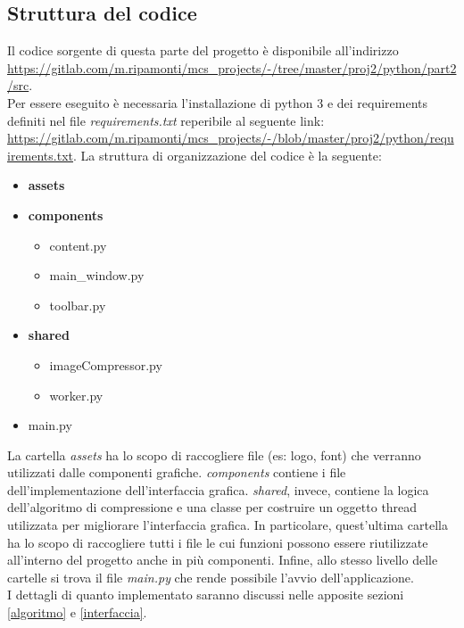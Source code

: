 \subsection{Struttura del codice}
Il codice sorgente di questa parte del progetto è disponibile all'indirizzo \url{https://gitlab.com/m.ripamonti/mcs_projects/-/tree/master/proj2/python/part2/src}. \\
Per essere eseguito è necessaria l'installazione di python 3 e dei requirements definiti nel file \emph{requirements.txt} reperibile al seguente link: \url{https://gitlab.com/m.ripamonti/mcs_projects/-/blob/master/proj2/python/requirements.txt}.
La struttura di organizzazione del codice è la seguente:
\begin{itemize}
    \item \textbf{assets}
    \item \textbf{components}
    \begin{itemize}
        \item content.py
        \item main\_window.py
        \item toolbar.py
    \end{itemize}
    \item \textbf{shared}
    \begin{itemize}
        \item imageCompressor.py
        \item worker.py
    \end{itemize}
    \item main.py
\end{itemize}
La cartella \emph{assets} ha lo scopo di raccogliere file (es: logo, font) che verranno utilizzati dalle componenti grafiche. \emph{components} contiene i file dell'implementazione dell'interfaccia grafica. \emph{shared}, invece, contiene la logica dell'algoritmo di compressione e una classe per costruire un oggetto thread utilizzata per migliorare l'interfaccia grafica. In particolare, quest'ultima cartella ha lo scopo di raccogliere tutti i file le cui funzioni possono essere riutilizzate all'interno del progetto anche in più componenti. Infine, allo stesso livello delle cartelle si trova il file \emph{main.py} che rende possibile l'avvio dell'applicazione.\\
I dettagli di quanto implementato saranno discussi nelle apposite sezioni \ref{algoritmo} e \ref{interfaccia}.